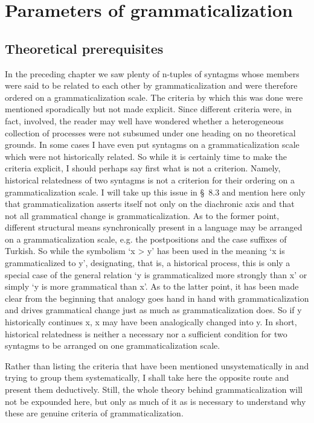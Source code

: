 \chapter{Parameters of grammaticalization}\label{chap:4}
\section{Theoretical prerequisites}

In the preceding chapter we saw plenty of n-tuples of syntagms whose members were said to be related to each other by grammaticalization and were therefore ordered on a grammaticalization scale. The criteria by which this was done were mentioned sporadically but not made explicit. Since different criteria were, in fact, involved, the reader may well have wondered whether a heterogeneous collection of processes were not subsumed under one heading on no theoretical grounds. In some cases I have even put syntagms on a grammaticalization scale which were not historically related. So while it is certainly time to make the criteria explicit, I should perhaps say first what is not a criterion. Namely, historical relatedness of two syntagms is not a criterion for their ordering on a grammaticalization scale. I will take up this issue in §~8.3 and mention here only that grammaticalization asserts itself not only on the diachronic axis and that not all grammatical change is grammaticalization. As to the former point, different structural means synchronically present in a language may be arranged on a grammaticalization scale, e.g. the postpositions and the case suffixes of Turkish. So while the symbolism ‘x {\textgreater} y’ has been used in the meaning ‘x is grammaticalized to y’, designating, that is, a historical process, this is only a special case of the general relation ‘y is grammaticalized more strongly than x’ or simply ‘y is more grammatical than x’. As to the latter point, it has been made clear from the beginning that analogy goes hand in hand with grammaticalization and drives grammatical change just as much as grammaticalization does. So if y historically continues x, x may have been analogically changed into y. In short, historical relatedness is neither a necessary nor a sufficient condition for two syntagms to be arranged on one grammaticalization scale.

Rather than listing the criteria that have been mentioned unsystematically in  and trying to group them systematically, I shall take here the opposite route and present them deductively. Still, the whole theory behind grammaticalization will not be expounded here, but only as much of it as is necessary to understand why these are genuine criteria of grammaticalization.

